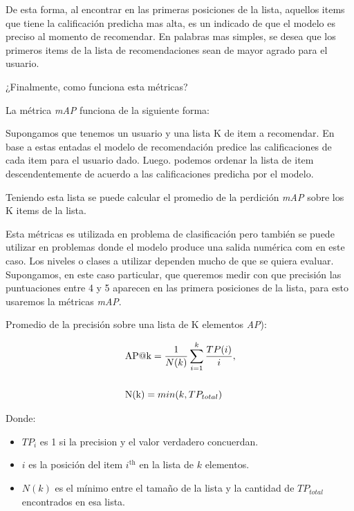 \documentclass[11pt,a4paper,twoside]{thesis}
\begin{document}
De esta forma, al encontrar en las primeras posiciones de la lista, aquellos items que tiene la calificación predicha mas alta, es un indicado de que el modelo es preciso al momento de recomendar. En palabras mas simples, se desea que los primeros items de la lista de recomendaciones sean de mayor agrado para el usuario.

¿Finalmente, como funciona esta métricas?

La métrica \textit{mAP\makeatletter@k} funciona de la siguiente forma:

Supongamos que tenemos un usuario y una lista K de item a recomendar. En base a estas entadas el modelo de recomendación predice las calificaciones de cada item para el usuario dado. Luego. podemos ordenar la lista de item descendentemente de acuerdo a las calificaciones predicha por el modelo.

Teniendo esta lista se puede calcular el promedio de la perdición \textit{mAP\makeatletter@k} sobre los K items de la lista.

Esta métricas es utilizada en problema de clasificación pero también se puede utilizar en problemas donde el modelo produce una salida numérica com en este caso. Los niveles o clases a utilizar dependen mucho de que se quiera evaluar. Supongamos, en este caso particular, que queremos medir con que precisión las puntuaciones entre 4 y 5 aparecen en las primera posiciones de la lista, para esto usaremos la métricas \textit{mAP\makeatletter@k}.

\begin{description}
	\item[Promedio de la precisión sobre una lista de K elementos \textit{AP\makeatletter@k}):]
\end{description}
\begin{equation*}
	\begin{split}
	& \operatorname{AP\makeatletter@k}=\frac{1}{N(k)} \sum_{i=1}^k \frac{ TP(i)}{i}, \\
	& \\
	& \operatorname{N(k)} = min(k, TP_{total}) \\
	\end{split}
\end{equation*}
\begin{description}
	\item[Donde:]
\end{description}
\begin{itemize}
	\item $TP_i$ es 1 si la precision y el valor verdadero concuerdan.
	\item $i$ es la posición del item $i^\mathrm{th}$ en la lista de $k$ elementos.
	\item $N(k)$ es el mínimo entre el tamaño de la lista y la cantidad de $TP_{total}$ encontrados en esa lista.
\end{itemize}
\end{document}
